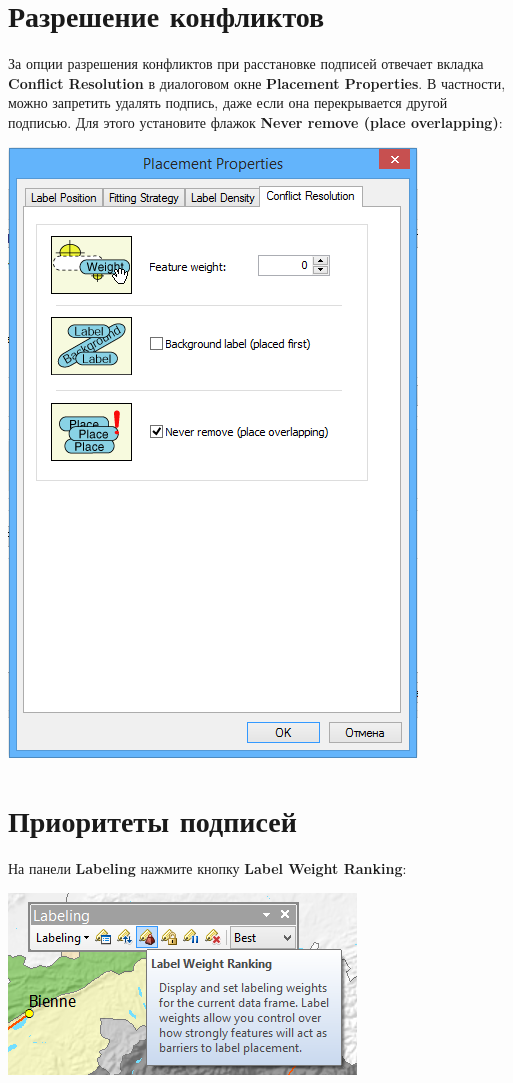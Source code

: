 \documentclass[]{book}
\theoremstyle{definition}
\theoremstyle{definition}
\theoremstyle{definition}
\theoremstyle{remark}
\begin{document}
\hypertarget{-}{%
\section{Разрешение конфликтов}\label{-}}

За опции разрешения конфликтов при расстановке подписей отвечает вкладка
\textbf{Conflict Resolution} в диалоговом окне \textbf{Placement
Properties}. В частности, можно запретить удалять подпись, даже если она
перекрывается другой подписью. Для этого установите флажок \textbf{Never
remove (place overlapping)}:

\includegraphics{images/Appendix/image49.png}

\hypertarget{-}{%
\section{Приоритеты подписей}\label{-}}

На панели \textbf{Labeling} нажмите кнопку \textbf{Label Weight
Ranking}:

\includegraphics{images/Appendix/image50.png}
\end{document}
